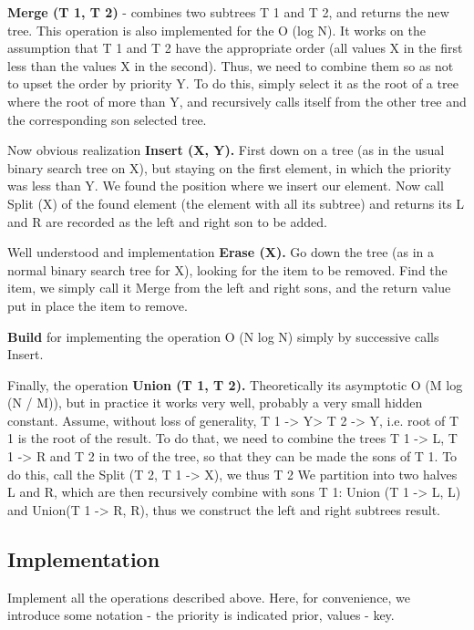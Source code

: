 \textbf{Merge (T 1, T 2)} - combines two subtrees T 1 and T 2, and returns the new tree. This operation is also implemented for the O (log N). It works on the assumption that T 1 and T 2 have the appropriate order (all values ​​X in the first less than the values ​​X in the second). Thus, we need to combine them so as not to upset the order by priority Y. To do this, simply select it as the root of a tree where the root of more than Y, and recursively calls itself from the other tree and the corresponding son selected tree.

Now obvious realization \textbf{Insert (X, Y).} First down on a tree (as in the usual binary search tree on X), but staying on the first element, in which the priority was less than Y. We found the position where we insert our element. Now call Split (X) of the found element (the element with all its subtree) and returns its L and R are recorded as the left and right son to be added.

Well understood and implementation \textbf{Erase (X).} Go down the tree (as in a normal binary search tree for X), looking for the item to be removed. Find the item, we simply call it Merge from the left and right sons, and the return value put in place the item to remove.

\textbf{Build} for implementing the operation O (N log N) simply by successive calls Insert.

Finally, the operation \textbf{Union (T 1, T 2).} Theoretically its asymptotic O (M log (N / M)), but in practice it works very well, probably a very small hidden constant. Assume, without loss of generality, T 1 -> Y> T 2 -> Y, i.e. root of T 1 is the root of the result. To do that, we need to combine the trees T 1 -> L, T 1 -> R and T 2 in two of the tree, so that they can be made ​​the sons of T 1. To do this, call the Split (T 2, T 1 -> X), we thus T 2 We partition into two halves L and R, which are then recursively combine with sons T 1: Union (T 1 -> L, L) and Union(T 1 -> R, R), thus we construct the left and right subtrees result.

\subsection{ Implementation }
Implement all the operations described above. Here, for convenience, we introduce some notation - the priority is indicated prior, values ​​- key.

